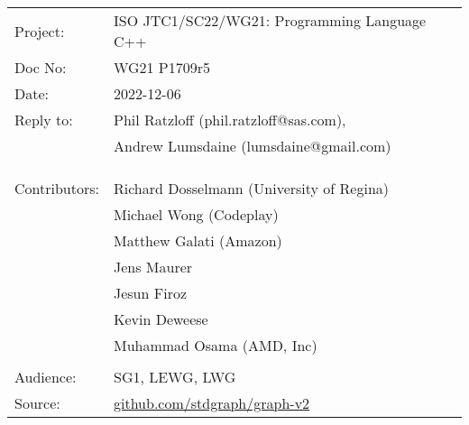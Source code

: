 \documentclass[10pt,oneside,openany,final]{memoir}
\begin{document}
\pagestyle{cpppage}


\begin{tabular}{@{}ll}
  Project:      & ISO JTC1/SC22/WG21: Programming Language C++           \\
  Doc No:       & WG21 P1709r5                                           \\
  Date:         & 2022-12-06                                             \\
  Reply to:     & Phil Ratzloff (phil.ratzloff@sas.com),                 \\
                & Andrew Lumsdaine (lumsdaine@gmail.com)                 \\
                &                                                        \\
                &                                                        \\
                &                                                        \\
  Contributors: & Richard Dosselmann (University of Regina)              \\
                & Michael Wong (Codeplay)                                \\
                & Matthew Galati (Amazon)                                \\
                & Jens Maurer                                            \\
                & Jesun Firoz                                            \\
                & Kevin Deweese                                          \\
                & Muhammad Osama (AMD, Inc)                              \\
                &                                                        \\
  Audience:     & SG1, LEWG, LWG                                         \\
  Source:       & \href{https://github.com/stdgraph/graph-v2}{github.com/stdgraph/graph-v2}    \\
\end{tabular}
\end{document}

